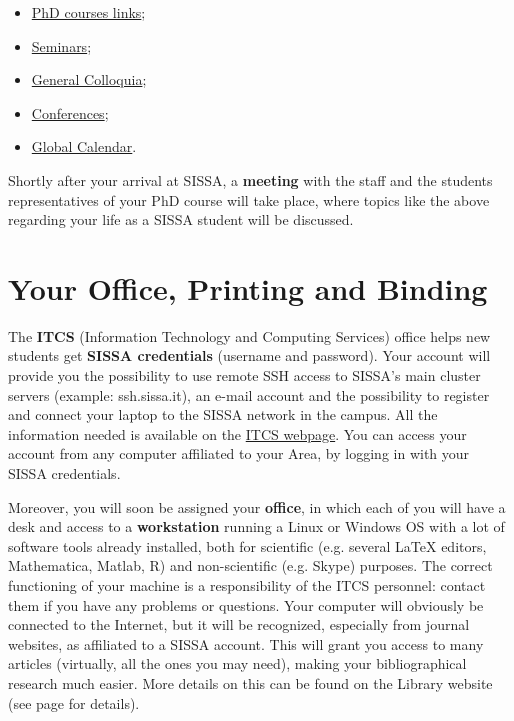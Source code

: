 \documentclass{sissavademecum}
\begin{document}
\begin{itemize}
    \item
    \href{https://www.sissa.it/phd-courses}{PhD courses links};
    \item
    \href{https://www.sissa.it/calendar/event-type/seminar}{Seminars};
    \item
    \href{https://www.sissa.it/news/colloquia}{General Colloquia};
    \item
    \href{https://www.sissa.it/news/conferences}{Conferences};
    \item
    \href{https://www.sissa.it/calendar}{Global Calendar}.
\end{itemize}
Shortly after your arrival at SISSA, a \textbf{meeting} with the staff and the students representatives of your PhD course will take place, where topics like the above regarding your life as a SISSA student will be discussed.


\section{Your Office, Printing and Binding}

The \textbf{ITCS} (Information Technology and Computing Services) office helps new students get \textbf{SISSA credentials} (username and password). Your account will provide you the possibility to use remote SSH access to SISSA's main cluster servers (example: ssh.sissa.it), an e-mail account and the possibility to register and connect your laptop to the SISSA network in the campus. All the information needed is available on the \href{https://www.itcs.sissa.it}{ITCS webpage}. You can access your account from any computer affiliated to your Area, by logging in with your SISSA credentials.


Moreover, you will soon be assigned your \textbf{office}, in which each of you will have a desk and access to a \textbf{workstation} running a Linux or Windows OS with a lot of software tools already installed, both for scientific (e.g. several LaTeX editors, Mathematica, Matlab, R) and non-scientific (e.g. Skype) purposes. The correct functioning of your machine is a responsibility of the ITCS personnel: contact them if you have any problems or questions. Your computer will obviously be connected to the Internet, but it will be recognized, especially from journal websites, as affiliated to a SISSA account. This will grant you access to many articles (virtually, all the ones you may need), making your bibliographical research much easier. More details on this can be found on the Library website (see page \pageref{sec:Library} for details).
\end{document}
